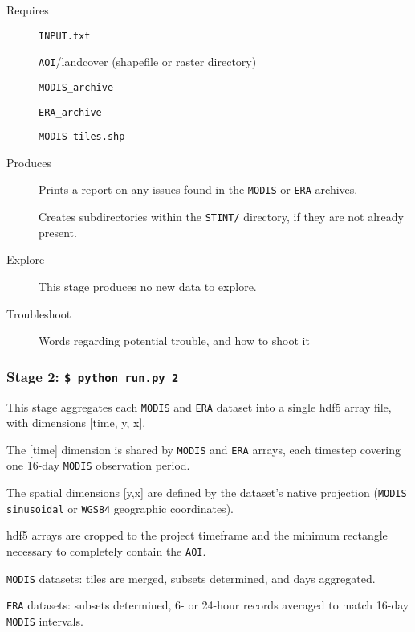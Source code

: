 \documentclass[twoside,a4paper]{refart}
\begin{document}
  \begin{description}
    \item [Requires]
     
          \texttt{INPUT.txt}
        
          \texttt{AOI}/landcover (shapefile or raster directory)
        
          \texttt{MODIS\_archive}
        
          \texttt{ERA\_archive}
        
          \texttt{MODIS\_tiles.shp}
      
  
  
    \item [Produces]
      Prints a report on any issues found in the 
      \texttt{MODIS} or \texttt{ERA} archives.
      
      Creates subdirectories within the \texttt{STINT/} directory, 
      if they are not already present.
      

    \item [Explore]
      This stage produces no new data to explore.

    \item [Troubleshoot]
      Words regarding potential trouble, and how to shoot it
  \end{description}
  
\subsubsection{\textbf{Stage 2:} \texttt{\$ python run.py 2}}
This stage aggregates each \texttt{MODIS} and \texttt{ERA} dataset into
a single hdf5 array file, with dimensions [time, y, x].

The [time] dimension is shared by \texttt{MODIS} and \texttt{ERA} arrays, each timestep covering one 16-day \texttt{MODIS} observation period.

The spatial dimensions [y,x] are defined by the dataset's 
native projection (\texttt{MODIS sinusoidal} or \texttt{WGS84} geographic coordinates).
        
hdf5 arrays are cropped to the project timeframe and the minimum 
rectangle necessary to completely contain the \texttt{AOI}.


\texttt{MODIS} datasets: tiles are merged, subsets determined, and days aggregated.

\texttt{ERA} datasets: subsets determined, 6- or 24-hour records averaged to match 16-day \texttt{MODIS} intervals.
\end{document}
